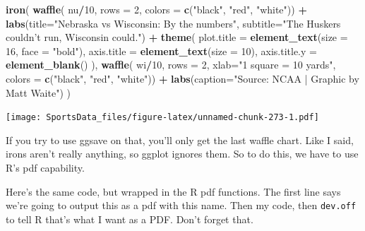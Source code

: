 \documentclass[]{book}
\newenvironment{Shaded}{\begin{snugshade}}{\end{snugshade}}
\newcommand{\DataTypeTok}[1]{\textcolor[rgb]{0.13,0.29,0.53}{#1}}
\newcommand{\DecValTok}[1]{\textcolor[rgb]{0.00,0.00,0.81}{#1}}
\newcommand{\KeywordTok}[1]{\textcolor[rgb]{0.13,0.29,0.53}{\textbf{#1}}}
\newcommand{\NormalTok}[1]{#1}
\newcommand{\OperatorTok}[1]{\textcolor[rgb]{0.81,0.36,0.00}{\textbf{#1}}}
\newcommand{\StringTok}[1]{\textcolor[rgb]{0.31,0.60,0.02}{#1}}
\begin{document}
\begin{Shaded}
\begin{Highlighting}[]
\KeywordTok{iron}\NormalTok{(}
 \KeywordTok{waffle}\NormalTok{(}
\NormalTok{   nu}\OperatorTok{/}\DecValTok{10}\NormalTok{, }
   \DataTypeTok{rows =} \DecValTok{2}\NormalTok{, }
   \DataTypeTok{colors =} \KeywordTok{c}\NormalTok{(}\StringTok{"black"}\NormalTok{, }\StringTok{"red"}\NormalTok{, }\StringTok{"white"}\NormalTok{)) }\OperatorTok{+}\StringTok{ }
\StringTok{   }\KeywordTok{labs}\NormalTok{(}\DataTypeTok{title=}\StringTok{"Nebraska vs Wisconsin: By the numbers"}\NormalTok{, }\DataTypeTok{subtitle=}\StringTok{"The Huskers couldn't run, Wisconsin could."}\NormalTok{) }\OperatorTok{+}\StringTok{ }
\StringTok{   }\KeywordTok{theme}\NormalTok{(}
    \DataTypeTok{plot.title =} \KeywordTok{element_text}\NormalTok{(}\DataTypeTok{size =} \DecValTok{16}\NormalTok{, }\DataTypeTok{face =} \StringTok{"bold"}\NormalTok{),}
    \DataTypeTok{axis.title =} \KeywordTok{element_text}\NormalTok{(}\DataTypeTok{size =} \DecValTok{10}\NormalTok{),}
    \DataTypeTok{axis.title.y =} \KeywordTok{element_blank}\NormalTok{()}
\NormalTok{  ),}
 \KeywordTok{waffle}\NormalTok{(}
\NormalTok{   wi}\OperatorTok{/}\DecValTok{10}\NormalTok{, }
   \DataTypeTok{rows =} \DecValTok{2}\NormalTok{, }
   \DataTypeTok{xlab=}\StringTok{"1 square = 10 yards"}\NormalTok{, }
   \DataTypeTok{colors =} \KeywordTok{c}\NormalTok{(}\StringTok{"black"}\NormalTok{, }\StringTok{"red"}\NormalTok{, }\StringTok{"white"}\NormalTok{)) }\OperatorTok{+}\StringTok{ }\KeywordTok{labs}\NormalTok{(}\DataTypeTok{caption=}\StringTok{"Source: NCAA | Graphic by Matt Waite"}\NormalTok{)}
\NormalTok{) }
\end{Highlighting}
\end{Shaded}

\texttt{[image: SportsData\_files/figure-latex/unnamed-chunk-273-1.pdf]}

If you try to use ggsave on that, you'll only get the last waffle chart. Like I said, irons aren't really anything, so ggplot ignores them. So to do this, we have to use R's pdf capability.

Here's the same code, but wrapped in the R pdf functions. The first line says we're going to output this as a pdf with this name. Then my code, then \texttt{dev.off} to tell R that's what I want as a PDF. Don't forget that.
\end{document}
